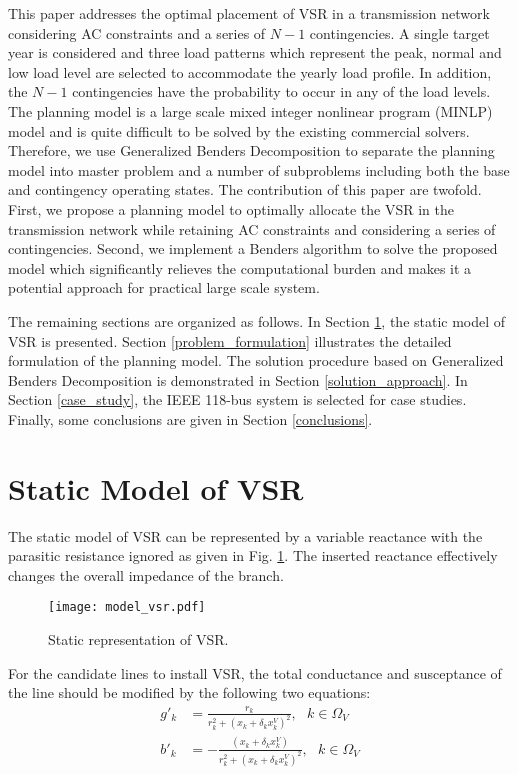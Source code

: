 \documentclass[journal]{IEEEtran}
\begin{document}
This paper addresses the optimal placement of VSR in a transmission network considering AC constraints and a series of $N-1$ contingencies. A single target year is considered and three load patterns which represent the peak, normal and low load level are selected to accommodate the yearly load profile. In addition, the $N-1$ contingencies have the probability to occur in any of the load levels. The planning model is a large scale mixed integer nonlinear program (MINLP) model and is quite difficult to be solved by the existing commercial solvers. Therefore, we use Generalized Benders Decomposition to separate the planning model into master problem and a number of subproblems including both the base and contingency operating states. The contribution of this paper are twofold. First, we propose a planning model to optimally allocate the VSR in the transmission network while retaining AC constraints and considering a series of contingencies. Second, we implement a Benders algorithm to solve the proposed model which significantly relieves the computational burden and makes it a potential approach for practical large scale system. 

The remaining sections are organized as follows. In Section \ref{static_model}, the static model of VSR is presented. Section \ref{problem_formulation} illustrates the detailed formulation of the planning model. The solution procedure based on Generalized Benders Decomposition is demonstrated in Section \ref{solution_approach}. In Section \ref{case_study}, the IEEE 118-bus system is selected for case studies. Finally, some conclusions are given in Section \ref{conclusions}.

\section{Static Model of VSR}
\label{static_model}
The static model of VSR can be represented by a variable reactance with the parasitic resistance ignored as given in Fig. \ref{CVSR_steady}. The inserted reactance effectively changes the overall impedance of the branch.
\begin{figure}[!htb]
	\centering
	\texttt{[image: model\_vsr.pdf]}
	\caption{Static representation of VSR.}
	\label{CVSR_steady}
\end{figure}

For the candidate lines to install VSR, the total conductance and susceptance of the line should be modified by the following two equations:
\begin{align}
	g'_{k}&=\frac{r_{k}}{r_{k}^2+(x_{k}+\delta_kx_{k}^{V})^2}, \ \ \ k\in \Omega_{V}  \\
	b'_{k}&=-\frac{(x_{k}+\delta_kx^{V}_{k})}{r_{k}^2+(x_{k}+\delta_kx^{V}_{k})^2}, \ \ \ k\in \Omega_{V}
\end{align}
\end{document}
